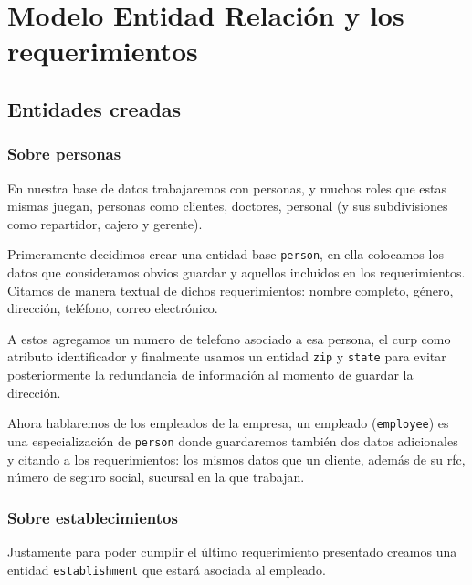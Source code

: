 \documentclass[12pt, fleqn]{report}                             %
\theoremstyle{break}                                            %
\begin{document}
    \chapter{
       Modelo Entidad Relación y los requerimientos}

      \section{Entidades creadas}

        \subsection{Sobre personas}

          En nuestra base de datos trabajaremos con personas, y muchos roles que estas mismas
          juegan, personas como clientes, doctores, personal (y sus subdivisiones como
          repartidor, cajero y gerente).

          Primeramente decidimos crear una entidad base \texttt{person}, en ella colocamos los datos
          que consideramos obvios guardar y aquellos incluidos en los requerimientos.
          Citamos de manera textual de dichos requerimientos: 
          nombre completo, género, dirección, teléfono, correo electrónico.

          A estos agregamos un numero de telefono asociado a esa persona, el curp como atributo 
          identificador y finalmente usamos un entidad \texttt{zip} y \texttt{state} para evitar posteriormente
          la redundancia de información al momento de guardar la dirección.

          Ahora hablaremos de los empleados de la empresa, un empleado (\texttt{employee}) es 
          una especialización de \texttt{person}
          donde guardaremos también dos datos adicionales y citando a los requerimientos:
          los mismos datos que un cliente, además de su rfc, número de seguro social, 
          sucursal en la que trabajan.

        \subsection{Sobre establecimientos}

          Justamente para poder cumplir el último requerimiento presentado creamos una 
          entidad \texttt{establishment} que estará asociada al empleado.
\end{document}
